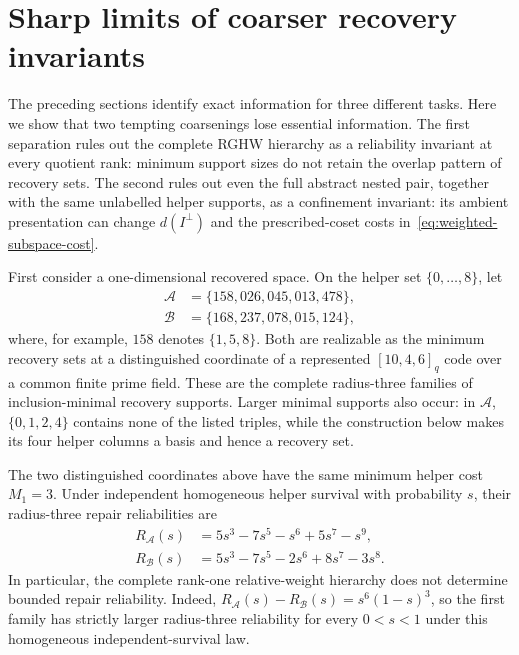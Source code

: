 \section{Sharp limits of coarser recovery invariants}
\label{sec:separations}

The preceding sections identify exact information for three different tasks.
Here we show that two tempting coarsenings lose essential information.  The
first separation rules out the complete RGHW hierarchy as a reliability
invariant at every quotient rank: minimum support sizes do not retain the
overlap pattern of recovery sets.  The second rules out even the full abstract
nested pair, together with the same unlabelled helper supports, as a
confinement invariant: its ambient presentation can change $d(I^\perp)$ and
the prescribed-coset costs in~\eqref{eq:weighted-subspace-cost}.

First consider a one-dimensional recovered space.  On the helper set
$\{0,\ldots,8\}$, let
\[
 \begin{split}
  \mathcal A&=\{158,026,045,013,478\},\\
  \mathcal B&=\{168,237,078,015,124\},
 \end{split}
\]
where, for example, $158$ denotes $\{1,5,8\}$.  Both are realizable as the
minimum recovery sets at a distinguished coordinate of a represented
$[10,4,6]_q$ code over a common finite prime field.
These are the complete radius-three families of inclusion-minimal recovery
supports.  Larger minimal supports also occur: in $\mathcal A$,
$\{0,1,2,4\}$ contains none of the listed triples, while the construction
below makes its four helper columns a basis and hence a recovery set.

\begin{proposition}
\label{prop:rank-one-reliability-separation}
%
The two distinguished coordinates above have the same minimum helper cost
$M_1=3$.  Under independent homogeneous helper survival with probability
$s$, their radius-three repair reliabilities are
\begin{align}
 R_{\mathcal A}(s)&=5s^3-7s^5-s^6+5s^7-s^9,
 \label{eq:reliability-A}\\
 R_{\mathcal B}(s)&=5s^3-7s^5-2s^6+8s^7-3s^8.
 \label{eq:reliability-B}
\end{align}
In particular, the complete rank-one relative-weight hierarchy does not
determine bounded repair reliability.
Indeed, $R_{\mathcal A}(s)-R_{\mathcal B}(s)=s^6(1-s)^3$, so the first
family has strictly larger radius-three reliability for every $0<s<1$
under this homogeneous independent-survival law.
\end{proposition}

